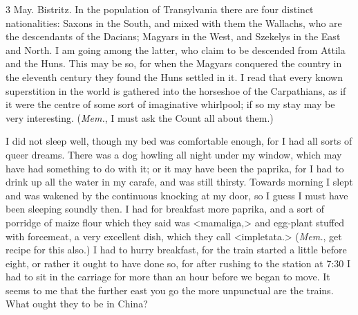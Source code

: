 \begin{diary}{3 May. Bistritz.}
In the population of Transylvania there are four distinct nationalities: Saxons in the South, and mixed with them the Wallachs, who are the descendants of the Dacians; Magyars in the West, and Szekelys in the East and North. I am going among the latter, who claim to be descended from Attila and the Huns. This may be so, for when the Magyars conquered the country in the eleventh century they found the Huns settled in it. I read that every known superstition in the world is gathered into the horseshoe of the Carpathians, as if it were the centre of some sort of imaginative whirlpool; if so my stay may be very interesting. (\textit{Mem.}, I must ask the Count all about them.)

I did not sleep well, though my bed was comfortable enough, for I had all sorts of queer dreams. There was a dog howling all night under my window, which may have had something to do with it; or it may have been the paprika, for I had to drink up all the water in my carafe, and was still thirsty. Towards morning I slept and was wakened by the continuous knocking at my door, so I guess I must have been sleeping soundly then. I had for breakfast more paprika, and a sort of porridge of maize flour which they said was <mamaliga,> and egg-plant stuffed with forcemeat, a very excellent dish, which they call <impletata.> (\textit{Mem.}, get recipe for this also.) I had to hurry breakfast, for the train started a little before eight, or rather it ought to have done so, for after rushing to the station at 7:30 I had to sit in the carriage for more than an hour before we began to move. It seems to me that the further east you go the more unpunctual are the trains. What ought they to be in China?


\end{diary}
